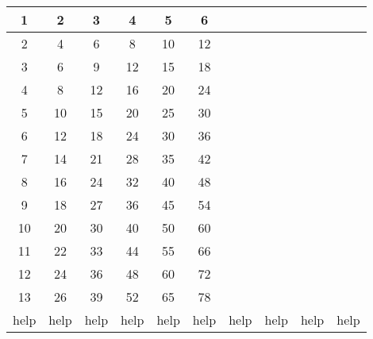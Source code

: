 \documentclass[12pt]{article}
\begin{document}
\begin{tabular}{ |c|c|c|c|c|c|c|c|c|c|}
\hline
1 & 2 & 3 & 4 & 5 & 6 &  &  &  &   \\
\hline
2 & 4 & 6 & 8 & 10 & 12 &  &  &  &   \\
\hline
3 & 6 & 9 & 12 & 15 & 18 &  &  &  &   \\
\hline
4 & 8 & 12 & 16 & 20 & 24 &  &  &  &   \\
\hline
5 & 10 & 15 & 20 & 25 & 30 &  &  &  &   \\
\hline
6 & 12 & 18 & 24 & 30 & 36 &  &  &  &   \\
\hline
7 & 14 & 21 & 28 & 35 & 42 &  &  &  &   \\
\hline
8 & 16 & 24 & 32 & 40 & 48 &  &  &  &   \\
\hline
9 & 18 & 27 & 36 & 45 & 54 &  &  &  &   \\
\hline
10 & 20 & 30 & 40 & 50 & 60 &  &  &  &   \\
\hline
11 & 22 & 33 & 44 & 55 & 66 &  &  &  &   \\
\hline
12 & 24 & 36 & 48 & 60 & 72 &  &  &  &   \\
\hline
13 & 26 & 39 & 52 & 65 & 78 &  &  &  &   \\
\hline
help & help & help & help & help & help & help & help & help & help  \\
\hline
\end{tabular}
\end{document}
